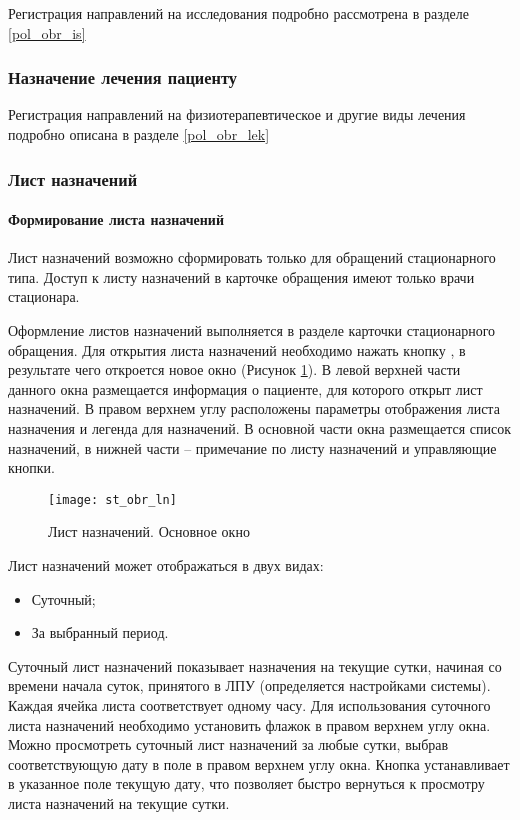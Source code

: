 Регистрация направлений на исследования подробно рассмотрена в разделе \ref{pol_obr_is}

\subsubsection{Назначение лечения пациенту}

Регистрация направлений на физиотерапевтическое и другие виды лечения подробно описана в разделе \ref{pol_obr_lek}

\subsubsection{Лист назначений}

\paragraph{Формирование листа назначений}

Лист назначений возможно сформировать только для обращений стационарного типа. Доступ к листу назначений в карточке обращения имеют только врачи стационара.

Оформление листов назначений выполняется в разделе  карточки стационарного обращения. Для открытия листа назначений необходимо нажать кнопку , в результате чего откроется новое окно  (Рисунок \ref{img_st_obr_ln}). В левой верхней части данного окна размещается информация о пациенте, для которого открыт лист назначений. В правом верхнем углу расположены параметры отображения листа назначения и легенда для назначений. В основной части окна размещается список назначений, в нижней части – примечание по листу назначений и управляющие кнопки.

\begin{figure}[ht]\centering
   \texttt{[image: st\_obr\_ln]}
   \caption{Лист назначений. Основное окно}
   \label{img_st_obr_ln}
\end{figure} 

Лист назначений может отображаться в двух видах:
\begin{itemize}
 \item Суточный;
 \item За выбранный период.
\end{itemize}
 
Суточный лист назначений показывает назначения на текущие сутки, начиная со времени начала суток, принятого в ЛПУ (определяется настройками системы). Каждая ячейка листа соответствует одному часу. Для использования суточного листа назначений необходимо установить флажок  в правом верхнем углу окна. Можно просмотреть суточный лист назначений за любые сутки, выбрав соответствующую дату в поле  в правом верхнем углу окна. Кнопка  устанавливает в указанное поле текущую дату, что позволяет быстро вернуться к просмотру листа назначений на текущие сутки.

